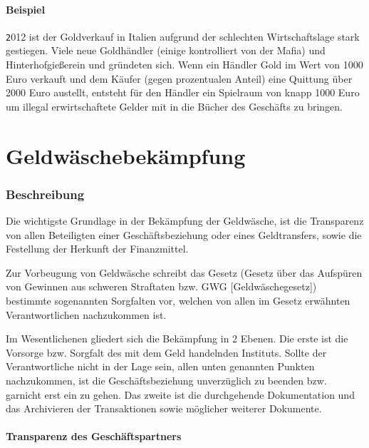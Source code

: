 \documentclass{article}
\begin{document}
        \subsection[Beispiel]{Beispiel}

            \texttt
            2012 ist der Goldverkauf in Italien aufgrund der schlechten Wirtschaftslage stark gestiegen.
            \cite{GoldItalien}
            Viele neue Goldhändler (einige kontrolliert von der Mafia) und Hinterhofgießerein und gründeten sich.
            Wenn ein Händler Gold im Wert von 1000 Euro verkauft und dem Käufer (gegen prozentualen Anteil) eine Quittung über 2000 Euro austellt, entsteht für den Händler ein Spielraum von knapp 1000 Euro um illegal erwirtschaftete Gelder mit in die Bücher des Geschäfts zu bringen.

\newpage

\part[Bekämpfung]{Geldwäschebekämpfung}

    \section[Beschreibung]{Beschreibung}

        Die wichtigste Grundlage in der Bekämpfung der Geldwäsche, ist die Transparenz von allen Beteiligten einer Geschäftsbeziehung oder eines Geldtransfers, sowie die Festellung der Herkunft der Finanzmittel.

        Zur Vorbeugung von Geldwäsche schreibt das Gesetz (Gesetz über das Aufspüren von Gewinnen aus schweren Straftaten bzw. GWG [Geldwäschegesetz]) bestimmte sogenannten Sorgfalten vor, welchen von allen im Gesetz erwähnten Verantwortlichen nachzukommen ist.

        Im Wesentlichenen gliedert sich die Bekämpfung in 2 Ebenen. Die erste ist die Vorsorge bzw. Sorgfalt des mit dem Geld handelnden Instituts. Sollte der Verantwortliche nicht in der Lage sein, allen unten genannten Punkten nachzukommen, ist die Geschäftsbeziehung unverzüglich zu beenden bzw. garnicht erst ein zu gehen. 
        Das zweite ist die durchgehende Dokumentation und das Archivieren der Transaktionen sowie möglicher weiterer Dokumente.

        \subsection[Transparenz des Geschäftspartners]{Transparenz des Geschäftspartners}
\end{document}
